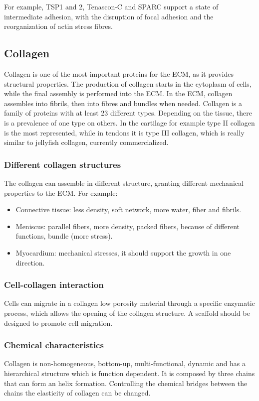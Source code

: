 	For example, TSP1 and 2, Tenascon-C and SPARC support a state of intermediate adhesion, with the disruption of focal adhesion and the reorganization of actin stress fibres.

	\subsection{Collagen}
	Collagen is one of the most important proteins for the ECM, as it provides structural properties.
	The production of collagen starts in the cytoplasm of cells, while the final assembly is performed into the ECM.
	In the ECM, collagen assembles into fibrils, then into fibres and bundles when needed.
	Collagen is a family of proteins with at least 23 different types.
	Depending on the tissue, there is a prevalence of one type on others.
	In the cartilage for example type II collagen is the most represented, while in tendons it is type III collagen, which is really similar to jellyfish collagen, currently commercialized.

		\subsubsection{Different collagen structures}
		The collagen can assemble in different structure, granting different mechanical properties to the ECM.
		For example:

		\begin{multicols}{2}
			\begin{itemize}
				\item Connective tissue: less density, soft network, more water, fiber and fibrils.
				\item Meniscus: parallel fibers, more density, packed fibers, because of different functions, bundle (more stress).
				\item Myocardium: mechanical stresses, it should support the growth in one direction.
			\end{itemize}
		\end{multicols}

		\subsubsection{Cell-collagen interaction}
		Cells can migrate in a collagen low porosity material through a specific enzymatic process, which allows the opening of the collagen structure.
		A scaffold should be designed to promote cell migration.

		\subsubsection{Chemical characteristics}
		Collagen is non-homogeneous, bottom-up, multi-functional, dynamic and has a hierarchical structure which is function dependent.
		It is composed by three chains that can form an helix formation.
		Controlling the chemical bridges between the chains the elasticity of collagen can be changed.

